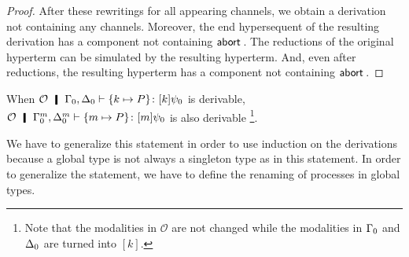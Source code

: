 {\begin{proof}
After these rewritings for all appearing channels,
we obtain a derivation not containing any channels.
Moreover, the end hypersequent of the resulting derivation has a component
not containing $\mathsf{abort\,}$.
The reductions of the original hyperterm can be simulated by the
resulting hyperterm.  And, even after reductions, the resulting
hyperterm has a component not containing $\mathsf{abort\,}$.
\end{proof}


 \begin{proposition}
  \label{process-change}
  When $\mathcal O \hmid \G_0,\D_0\tr\tj{\kmapsto{P}}{[k]\psi_0}$ is derivable,
  $\mathcal O\hmid \G_0^m, \D_0^m\tr\tj{\mmapsto{P}}{[m]\psi_0}$ is also
  derivable%
  \footnote{Note that the modalities in $\mathcal O$ are not changed
  while the modalities in $\Gamma_0$ and $\Delta_0$ are turned into $[k]$.}.
 \end{proposition}
 We have to generalize this statement in order to use induction on the
 derivations because a global type is not always a singleton type as in
 this statement.  In order to generalize the statement, we have to
 define the renaming of processes in global types.
  \begin{definition}
  \end{definition}

}
